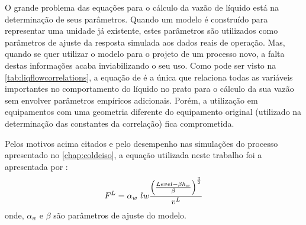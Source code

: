 O grande problema das equações para o cálculo da vazão de líquido está na determinação de seus parâmetros. Quando um
modelo é construído para representar uma unidade já existente, estes parâmetros
são utilizados como parâmetros de ajuste da resposta
simulada aos dados reais de operação. Mas, quando se quer utilizar o modelo
para o projeto de um processo novo, a falta destas informações acaba inviabilizando o seu uso.
Como pode ser visto na \autoref{tab:liqflowcorrelations},
a equação de  é a única que relaciona todas as variáveis importantes no comportamento
do líquido no prato para o cálculo da sua vazão sem envolver parâmetros
empíricos adicionais.
Porém,
a utilização em
equipamentos com uma geometria diferente do equipamento original (utilizado na
determinação das constantes da correlação) fica comprometida.

Pelos motivos acima citados e pelo desempenho nas simulações do processo
apresentado no \autoref{chap:coldeiso}, a equação utilizada neste trabalho foi
a apresentada por :
\begin{equation}
F^L = \alpha_w \ lw \dfrac{\left(\frac{Level - \beta h_w}{\beta} \right)^{\frac{3}{2}} }{v^L}\\
\end{equation}
onde, $\alpha_w$ e $\beta$ são parâmetros de ajuste do modelo.

